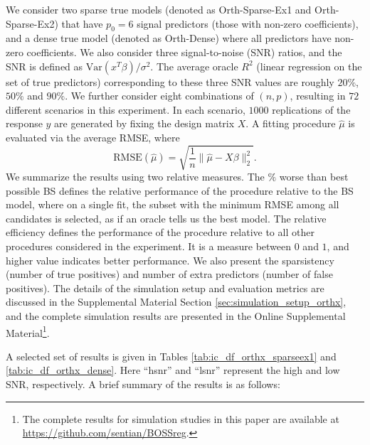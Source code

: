 We consider two sparse true models (denoted as Orth-Sparse-Ex1 and Orth-Sparse-Ex2) that have $p_0=6$ signal predictors (those with non-zero coefficients), and a dense true model (denoted as Orth-Dense) where all predictors have non-zero coefficients. We also consider three signal-to-noise (SNR) ratios, and the SNR is defined as $\text{Var}(x^T \beta)/\sigma^2$. The average oracle $R^2$ (linear regression on the set of true predictors) corresponding to these three SNR values are roughly $20\%$, $50\%$ and $90\%$. We further consider eight combinations of $(n,p)$, resulting in $72$ different scenarios in this experiment. In each scenario, $1000$ replications of the response $y$ are generated by fixing the design matrix $X$. A fitting procedure $\hat{\mu}$ is evaluated via the average RMSE, where 
\begin{equation*}
\text{RMSE}(\hat{\mu}) = \sqrt{ \frac{1}{n} \lVert \hat{\mu}-X\beta \rVert_2^2}.
\end{equation*}
We summarize the results using two relative measures. The $\%$ worse than best possible BS defines the relative performance of the procedure relative to the BS model, where on a single fit, the subset with the minimum RMSE among all candidates is selected, as if an oracle tells us the best model. The relative efficiency defines the performance of the procedure relative to all other procedures considered in the experiment. It is a measure between $0$ and $1$, and higher value indicates better performance. We also present the sparsistency (number of true positives) and number of extra predictors (number of false positives). The details of the simulation setup and evaluation metrics are discussed in the Supplemental Material Section \ref{sec:simulation_setup_orthx}, and the complete simulation results are presented in the Online Supplemental Material\footnote{The complete results for simulation studies in this paper are available at \url{https://github.com/sentian/BOSSreg}.}. 





A selected set of results is given in Tables \ref{tab:ic_df_orthx_sparseex1} and \ref{tab:ic_df_orthx_dense}. Here ``hsnr'' and ``lsnr'' represent the high and low SNR, respectively. A brief summary of the results is as follows:

